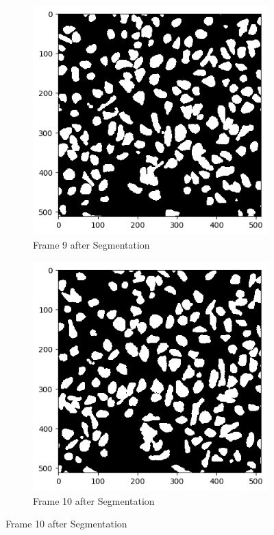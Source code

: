 \documentclass{article}
\begin{document}
\begin{figure}[h!]
  \begin{subfigure}{0.4\textwidth}
    \includegraphics[width=\linewidth]{Report/Appendix_Images/Segmentation-B-Growth/frame_9.png}
    \caption*{Frame 9 after Segmentation}
  \end{subfigure}
  \hfill
  \begin{subfigure}{0.4\textwidth}
    \includegraphics[width=\linewidth]{Report/Appendix_Images/Segmentation-B-Growth/frame_10.png}
    \caption*{Frame 10 after Segmentation}
  \end{subfigure}


\end{figure}
\end{document}
